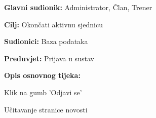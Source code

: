 					\noindent {}
					\begin{packed_item}
	
						\item \textbf{Glavni sudionik: } Administrator, Član, Trener
						\item  \textbf{Cilj: } Okončati aktivnu sjednicu
						\item  \textbf{Sudionici: } Baza podataka
						\item  \textbf{Preduvjet: } Prijava u sustav
						\item  \textbf{Opis osnovnog tijeka:}
						
						\item[] \begin{packed_enum}
	
							\item Klik na gumb 'Odjavi se'
							\item Učitavanje stranice novosti 
							
						\end{packed_enum}
					\end{packed_item}
					
